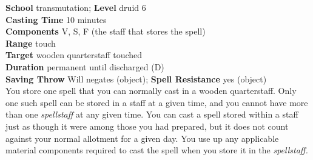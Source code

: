 \textbf{School} transmutation; \textbf{Level} druid 6\\
\textbf{Casting Time} 10 minutes\\
\textbf{Components} V, S, F (the staff that stores the spell)\\
\textbf{Range} touch\\
\textbf{Target }wooden quarterstaff touched\\
\textbf{Duration} permanent until discharged (D)\\
\textbf{Saving Throw }Will negates (object); \textbf{Spell Resistance} yes (object)\\
You store one spell that you can normally cast in a wooden quarterstaff. Only one such spell can be stored in a staff at a given time, and you cannot have more than one \textit{spellstaff }at any given time. You can cast a spell stored within a staff just as though it were among those you had prepared, but it does not count against your normal allotment for a given day. You use up any applicable material components required to cast the spell when you store it in the \textit{spellstaff.}\\
